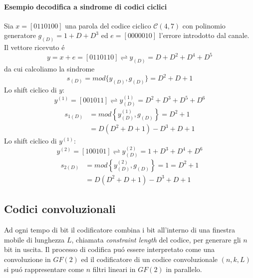                 \paragraph{Esempio decodifica a sindrome di codici ciclici}
                Sia $x=[0110100]$ una parola del codice ciclico $\mathcal{C}(4,7)$ con polinomio generatore $g_{(D)} = 1 + D + D^3$
                ed $e=[0000010]$ l'errore introdotto dal canale. Il vettore ricevuto é 
                \[
                    y= x+e = [0110110]\rightleftharpoons y_{(D)} = D+D^2+D^4+D^5 
                \]
                da cui calcoliamo la sindrome 
                \[
                    s_{(D)} = mod\{y_{(D)},g_{(D)}\}=D^2+D+1
                \]
                Lo shift ciclico di $y$:
                \[
                    y^{(1)} = [001011] \rightleftharpoons y^{(1)}_{(D)} = D^2+D^3+D^5+D^6   
                \]
                \begin{align}
                    s_{1(D)} &= mod\left\{y^{(1)}_{(D)},g_{(D)}\right\}= D^2+1  \nonumber \\
                             &= D(D^2+D+1)-D^3+D+1 \nonumber
                \end{align}
                Lo shift ciclico di $y^{(1)}$:
                \[
                    y^{(2)} = [100101] \rightleftharpoons y^{(2)}_{(D)} = 1+D^3+D^4+D^6   
                \]
                \begin{align}
                    s_{2(D)} &= mod\left\{y^{(2)}_{(D)},g_{(D)}\right\}= 1 = D^2+1  \nonumber \\
                             &= D(D^2+D+1)-D^3+D+1 \nonumber
                \end{align}
    \subsection{Codici convoluzionali}
        Ad ogni tempo di bit il codificatore combina i bit
        all'interno di una finestra mobile di lunghezza $L$, chiamata \emph{constraint length} del codice, per generare gli $n$ 
        bit in uscita. Il processo di codifica puó essere interpretato come una convoluzione in $GF(2)$ ed il codificatore di
        un codice convoluzionale $(n,k,L)$ si puó rappresentare come $n$ filtri lineari in $GF(2)$ in parallelo.
